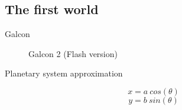 \documentclass{beamer}
\begin{document}
\subsection{The first world}
\begin{frame}{Galcon}
\begin{figure}[H]
\noindent{}
\caption{Galcon 2 (Flash version)}
\end{figure}
\end{frame}
\begin{frame}{Planetary system approximation}
\begin{figure}[H]
\begin{minipage}{.65\textwidth}
\noindent{}
\end{minipage}
\begin{minipage}{.3\textwidth}
$$x = a \: cos(\theta)$$
           $$y = b \: sin(\theta)$$
\end{minipage}
\end{figure}
\end{frame}
\end{document}
